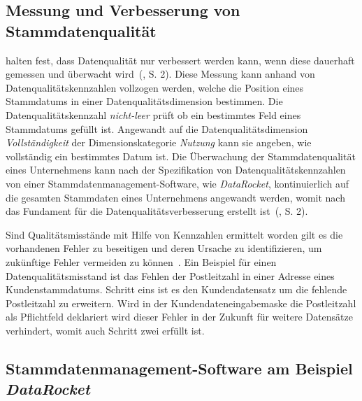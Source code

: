 \documentclass[
  language=german, %
  type=bachelor,%
  ngerman
]{isthesis}
\begin{document}
\begin{content}
	\subsection{Messung und Verbesserung von Stammdatenqualität}
	\textsc{\citeauthor{baghi2013controlling}} halten fest, dass Datenqualität
	nur verbessert werden kann, wenn diese dauerhaft gemessen und überwacht
	wird~(\citeyear{baghi2013controlling}, S. 2). Diese Messung kann anhand von
	Datenqualitätskennzahlen vollzogen werden, welche die Position eines
	Stammdatums in einer Datenqualitätsdimension bestimmen. Die
	Datenqualitätskennzahl \textit{nicht-leer} prüft \zB{} ob ein bestimmtes Feld
	eines Stammdatums gefüllt ist. Angewandt auf die Datenqualitätsdimension
	\textit{Vollständigkeit} der Dimensionskategorie \textit{Nutzung} kann sie
	angeben, wie vollständig ein bestimmtes Datum ist. Die Überwachung der
	Stammdatenqualität eines Unternehmens kann nach der Spezifikation von
	Datenqualitätskennzahlen von einer Stammdatenmanagement-Software, wie \zB{}
	\textit{DataRocket}, kontinuierlich auf die gesamten Stammdaten eines
	Unternehmens angewandt werden, womit nach
	\textsc{\citeauthor{baghi2013controlling}} das Fundament für die
	Datenqualitätsverbesserung erstellt ist~(\citeyear{baghi2013controlling}, S.
	2).

	Sind Qualitätsmisstände mit Hilfe von Kennzahlen ermittelt worden gilt es die
	vorhandenen Fehler zu beseitigen und deren Ursache zu identifizieren, um
	zukünftige Fehler vermeiden zu können~\cite[][S. 22]{eckerson2002data}. Ein
	Beispiel für einen Datenqualitätsmisstand ist das Fehlen der Postleitzahl in
	einer Adresse eines Kundenstammdatums. Schritt eins ist es den
	Kundendatensatz um die fehlende Postleitzahl zu erweitern. Wird in der
	Kundendateneingabemaske die Postleitzahl als Pflichtfeld deklariert wird
	dieser Fehler in der Zukunft für weitere Datensätze verhindert, womit auch
	Schritt zwei erfüllt ist.


  \subsection{Stammdatenmanagement-Software am Beispiel \textit{DataRocket}}\label{sec:Vorstellung-DataRocket}


\end{content}
\end{document}
